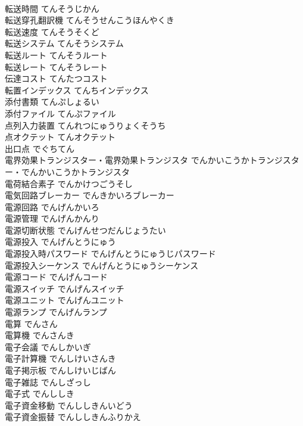 \documentclass[8pt]{extreport}
\begin{document}
\begin{CJK}{UTF8}{min}
\\	転送時間	てんそうじかん	
\\	転送穿孔翻訳機	てんそうせんこうほんやくき	
\\	転送速度	てんそうそくど	
\\	転送システム	てんそうシステム	
\\	転送ルート	てんそうルート	
\\	転送レート	てんそうレート	
\\	伝達コスト	てんたつコスト	
\\	転置インデックス	てんちインデックス	
\\	添付書類	てんぷしょるい	
\\	添付ファイル	てんぷファイル	
\\	点列入力装置	てんれつにゅうりょくそうち	
\\	点オクテット	てんオクテット	
\\	出口点	でぐちてん	
\\	電界効果トランジスター・電界効果トランジスタ	でんかいこうかトランジスター・でんかいこうかトランジスタ	
\\	電荷結合素子	でんかけつごうそし	
\\	電気回路ブレーカー	でんきかいろブレーカー	
\\	電源回路	でんげんかいろ	
\\	電源管理	でんげんかんり	
\\	電源切断状態	でんげんせつだんじょうたい	
\\	電源投入	でんげんとうにゅう	
\\	電源投入時パスワード	でんげんとうにゅうじパスワード	
\\	電源投入シーケンス	でんげんとうにゅうシーケンス	
\\	電源コード	でんげんコード	
\\	電源スイッチ	でんげんスイッチ	
\\	電源ユニット	でんげんユニット	
\\	電源ランプ	でんげんランプ	
\\	電算	でんさん	
\\	電算機	でんさんき	
\\	電子会議	でんしかいぎ	
\\	電子計算機	でんしけいさんき	
\\	電子掲示板	でんしけいじばん	
\\	電子雑誌	でんしざっし	
\\	電子式	でんししき	
\\	電子資金移動	でんししきんいどう	
\\	電子資金振替	でんししきんふりかえ	

\end{CJK}
\end{document}
